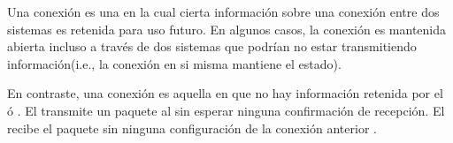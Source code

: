 Una conexión \stateful es una en la cual cierta información sobre una conexión entre dos sistemas es retenida para uso futuro. En algunos casos, la conexión es mantenida abierta incluso a través de dos sistemas que podrían no estar transmitiendo información(i.e., la conexión en si misma mantiene el estado)\cite{online_connection_stateful_stateless}.

En contraste, una conexión \stateless es aquella en que no hay información retenida por el \sender ó \receiver. El \sender transmite un paquete al \receiver sin esperar ninguna confirmación de recepción. El \receiver recibe el paquete sin ninguna configuración de la conexión anterior  \cite{online_connection_stateful_stateless}.


		